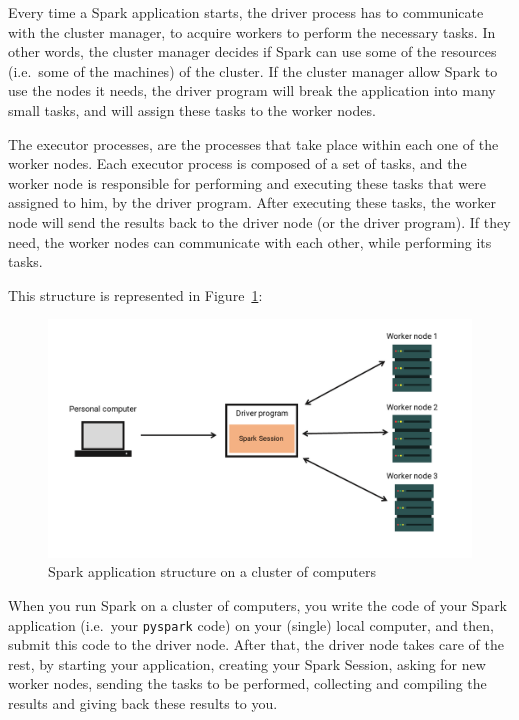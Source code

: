 \documentclass[
  11pt,
  letterpaper,
  DIV=11,
  numbers=noendperiod]{scrreprt}
\begin{document}
Every time a Spark application starts, the driver process has to
communicate with the cluster manager, to acquire workers to perform the
necessary tasks. In other words, the cluster manager decides if Spark
can use some of the resources (i.e.~some of the machines) of the
cluster. If the cluster manager allow Spark to use the nodes it needs,
the driver program will break the application into many small tasks, and
will assign these tasks to the worker nodes.

The executor processes, are the processes that take place within each
one of the worker nodes. Each executor process is composed of a set of
tasks, and the worker node is responsible for performing and executing
these tasks that were assigned to him, by the driver program. After
executing these tasks, the worker node will send the results back to the
driver node (or the driver program). If they need, the worker nodes can
communicate with each other, while performing its tasks.

This structure is represented in Figure~\ref{fig-spark-application}:

\begin{figure}

{\centering \includegraphics{Chapters/../Figures/spark-application.png}

}

\caption{\label{fig-spark-application}Spark application structure on a
cluster of computers}

\end{figure}

When you run Spark on a cluster of computers, you write the code of your
Spark application (i.e.~your \texttt{pyspark} code) on your (single)
local computer, and then, submit this code to the driver node. After
that, the driver node takes care of the rest, by starting your
application, creating your Spark Session, asking for new worker nodes,
sending the tasks to be performed, collecting and compiling the results
and giving back these results to you.
\end{document}
